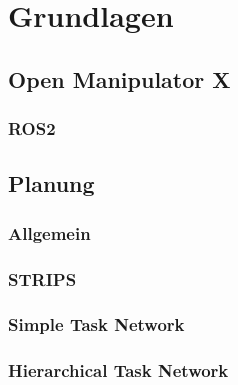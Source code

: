 \section {Grundlagen}
\subsection{Open Manipulator X}
\subsubsection{ROS2}
\subsection {Planung}
\subsubsection{Allgemein}
\subsubsection{STRIPS}
\subsubsection{Simple Task Network}
\subsubsection{Hierarchical Task Network}

\newpage